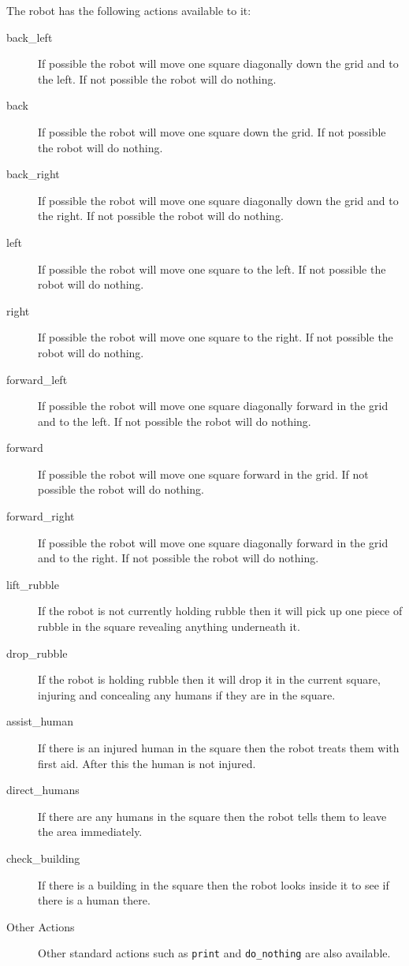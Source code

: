 \documentclass[a4]{article}
\begin{document}
The robot  has the following actions available to it:
\begin{description}
\item[back\_left] If possible the robot will move one square diagonally down the grid and to the left.  If not possible the robot will do nothing.
\item[back] If possible the robot will move one square down the grid.  If not possible the robot will do nothing.
\item[back\_right] If possible the robot will move one square diagonally down the grid and to the right.  If not possible the robot will do nothing.
\item[left] If possible the robot will move one square to the left.  If not possible the robot will do nothing.
\item[right] If possible the robot will move one square to the right.  If not possible the robot will do nothing.
\item[forward\_left] If possible the robot will move one square diagonally forward in the grid and to the left.  If not possible the robot will do nothing.
\item[forward] If possible the robot will move one square forward in the grid.  If not possible the robot will do nothing.
\item[forward\_right] If possible the robot will move one square diagonally forward in the grid and to the right.  If not possible the robot will do nothing.
\item[lift\_rubble] If the robot is not currently holding rubble then it will pick up one piece of rubble in the square revealing anything underneath it.
\item[drop\_rubble] If the robot is holding rubble then it will drop it in the current square, injuring and concealing any humans if they are in the square.
\item[assist\_human] If there is an injured human in the square then the robot treats them with first aid.  After this the human is not injured.
\item[direct\_humans] If there are any humans in the square then the robot tells them to leave the area immediately.
\item[check\_building] If there is a building in the square then the robot looks inside it to see if there is a human there.
\item[Other Actions] Other standard actions such as \texttt{print} and \texttt{do\_nothing} are also available.
\end{description}
\end{document}
